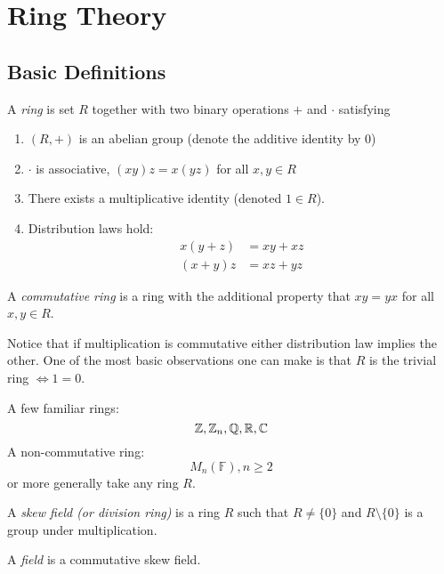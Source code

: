 \documentclass[master.tex]{subfiles}
\begin{document}
\section{Ring Theory}
\subsection{Basic Definitions}
\newcommand{\F}{\mathbb{F}} \newtheorem*{notation}{Notation}

\begin{defn*}
  A \emph{ring} is set \(R\) together with two binary operations \(+\) and \(\cdot\) satisfying
  \begin{enumerate}[label=(\roman*)]
  \item \((R,+)\) is an abelian group (denote the additive identity by \(0\))
  \item \(\cdot\) is associative, \((xy)z=x(yz)\) for all \(x,y \in R\)
  \item There exists a multiplicative identity (denoted \(1 \in R\)).
  \item Distribution laws hold:
    \begin{align*}
      x(y+z) &= xy + xz\\
      (x+y)z &= xz+yz
    \end{align*}
  \end{enumerate}
\end{defn*}

\begin{defn*}
  A \emph{commutative ring} is a ring with the additional property that \(xy=yx\) for all \(x,y \in R\).
\end{defn*}
Notice that if multiplication is commutative either distribution law implies the other. One of the most basic
observations one can make is that \(R\) is the trivial ring \(\iff 1=0\).

\begin{example*}
  A few familiar rings: \[{\mathbb Z},{\mathbb Z}_n,{\mathbb Q},{\mathbb R},{\mathbb C}\] A non-commutative ring:
  \[M_n(\F), n \ge 2\] or more generally take any ring \(R\).
\end{example*}

\begin{defn*}
  A \emph{skew field (or division ring)} is a ring \(R\) such that \(R \neq \{0\}\) and \(R \setminus \{0\}\) is a group
  under multiplication.
\end{defn*}

\begin{defn*}
  A \emph{field} is a commutative skew field.
\end{defn*}
\end{document}
